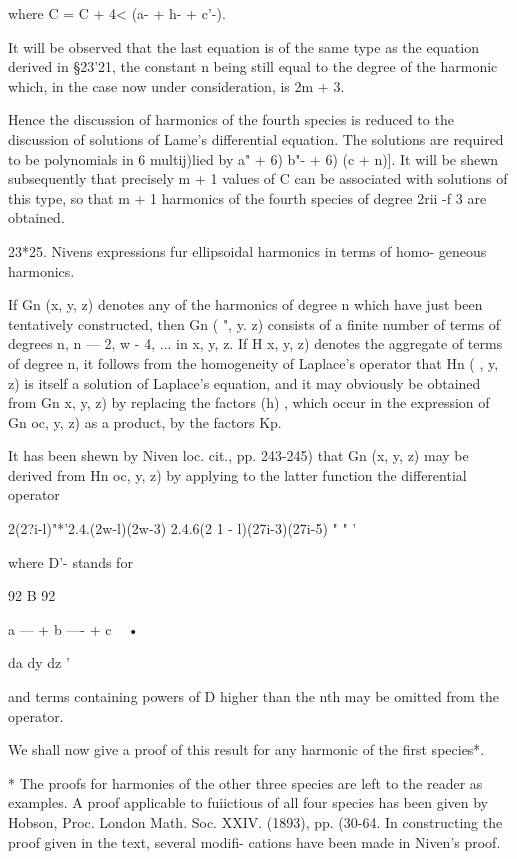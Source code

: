 {where C = C + 4< (a- + h- + c'-).

It will be observed that the last equation is of the same type as the
equation derived in §23'21, the constant n being still equal to the
degree of the harmonic which, in the case now under consideration, is
2m + 3.

Hence the discussion of harmonics of the fourth species is reduced to
the discussion of solutions of Lame's differential equation. The
solutions are required to be polynomials in 6 multij)lied by \/ a" +
6) b"- + 6) (c + n)]. It will be shewn subsequently that precisely m +
1 values of C can be associated with solutions of this type, so that m
+ 1 harmonics of the fourth species of degree 2rii -f 3 are obtained.

23*25. Nivens expressions fur ellipsoidal harmonics in terms of homo-
geneous harmonics.

If Gn (x, y, z) denotes any of the harmonics of degree n which have
just been tentatively constructed, then Gn ( ", y. z) consists of a
finite number of terms of degrees n, n — 2, w - 4, ... in x, y, z. If
H x, y, z) denotes the aggregate of terms of degree n, it follows from
the homogeneity of Laplace's operator that Hn ( , y, z) is itself a
solution of Laplace's equation, and it may obviously be obtained from
Gn x, y, z) by replacing the factors (h) , which occur in the
expression of Gn oc, y, z) as a product, by the factors Kp.

It has been shewn by Niven loc. cit., pp. 243-245) that Gn (x, y, z)
may be derived from Hn oc, y, z) by applying to the latter function
the differential operator

2(2?i-l)"*'2.4.(2w-l)(2w-3) 2.4.6(2 1 - l)(27i-3)(27i-5) " " '

where D'- stands for

92 B 92

a — + b —- + c ~ •

da dy dz '

and terms containing powers of D higher than the nth may be omitted
from the operator.

We shall now give a proof of this result for any harmonic of the first
species*.

* The proofs for harmonies of the other three species are left to the
reader as examples. A proof applicable to fuiictious of all four
species has been given by Hobson, Proc. London Math. Soc. XXIV.
(1893), pp. (30-64. In constructing the proof given in the text,
several modifi- cations have been made in Niven's proof.

}
